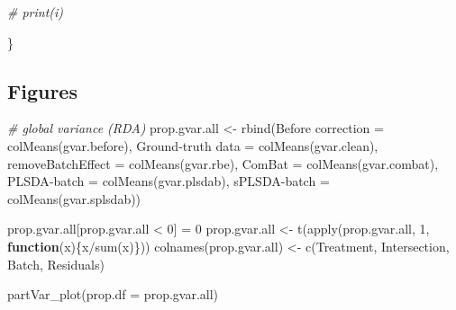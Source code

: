 \documentclass[
]{book}
\newenvironment{Shaded}{\begin{snugshade}}{\end{snugshade}}
\newcommand{\AttributeTok}[1]{\textcolor[rgb]{0.77,0.63,0.00}{#1}}
\newcommand{\CommentTok}[1]{\textcolor[rgb]{0.56,0.35,0.01}{\textit{#1}}}
\newcommand{\ControlFlowTok}[1]{\textcolor[rgb]{0.13,0.29,0.53}{\textbf{#1}}}
\newcommand{\DecValTok}[1]{\textcolor[rgb]{0.00,0.00,0.81}{#1}}
\newcommand{\FunctionTok}[1]{\textcolor[rgb]{0.00,0.00,0.00}{#1}}
\newcommand{\NormalTok}[1]{#1}
\newcommand{\OtherTok}[1]{\textcolor[rgb]{0.56,0.35,0.01}{#1}}
\newcommand{\SpecialCharTok}[1]{\textcolor[rgb]{0.00,0.00,0.00}{#1}}
\newcommand{\StringTok}[1]{\textcolor[rgb]{0.31,0.60,0.02}{#1}}
\begin{document}
\begin{Shaded}
\begin{Highlighting}[]
  \CommentTok{\# print(i)}
  
\NormalTok{\}}
\end{Highlighting}
\end{Shaded}

\hypertarget{figures-2}{%
\subsection{Figures}\label{figures-2}}

\begin{Shaded}
\begin{Highlighting}[]
\CommentTok{\# global variance (RDA)}
\NormalTok{prop.gvar.all }\OtherTok{\textless{}{-}} \FunctionTok{rbind}\NormalTok{(}\StringTok{\textasciigrave{}}\AttributeTok{Before correction}\StringTok{\textasciigrave{}} \OtherTok{=} \FunctionTok{colMeans}\NormalTok{(gvar.before),}
                       \StringTok{\textasciigrave{}}\AttributeTok{Ground{-}truth data}\StringTok{\textasciigrave{}} \OtherTok{=} \FunctionTok{colMeans}\NormalTok{(gvar.clean),}
                       \AttributeTok{removeBatchEffect =} \FunctionTok{colMeans}\NormalTok{(gvar.rbe),}
                       \AttributeTok{ComBat =} \FunctionTok{colMeans}\NormalTok{(gvar.combat),}
                       \StringTok{\textasciigrave{}}\AttributeTok{PLSDA{-}batch}\StringTok{\textasciigrave{}} \OtherTok{=} \FunctionTok{colMeans}\NormalTok{(gvar.plsdab),}
                       \StringTok{\textasciigrave{}}\AttributeTok{sPLSDA{-}batch}\StringTok{\textasciigrave{}} \OtherTok{=} \FunctionTok{colMeans}\NormalTok{(gvar.splsdab))}

\NormalTok{prop.gvar.all[prop.gvar.all }\SpecialCharTok{\textless{}} \DecValTok{0}\NormalTok{] }\OtherTok{=} \DecValTok{0}
\NormalTok{prop.gvar.all }\OtherTok{\textless{}{-}} \FunctionTok{t}\NormalTok{(}\FunctionTok{apply}\NormalTok{(prop.gvar.all, }\DecValTok{1}\NormalTok{, }\ControlFlowTok{function}\NormalTok{(x)\{x}\SpecialCharTok{/}\FunctionTok{sum}\NormalTok{(x)\}))}
\FunctionTok{colnames}\NormalTok{(prop.gvar.all) }\OtherTok{\textless{}{-}} \FunctionTok{c}\NormalTok{(}\StringTok{\textquotesingle{}Treatment\textquotesingle{}}\NormalTok{, }\StringTok{\textquotesingle{}Intersection\textquotesingle{}}\NormalTok{, }\StringTok{\textquotesingle{}Batch\textquotesingle{}}\NormalTok{, }\StringTok{\textquotesingle{}Residuals\textquotesingle{}}\NormalTok{)}

\FunctionTok{partVar\_plot}\NormalTok{(}\AttributeTok{prop.df =}\NormalTok{ prop.gvar.all)}
\end{Highlighting}
\end{Shaded}
\end{document}
